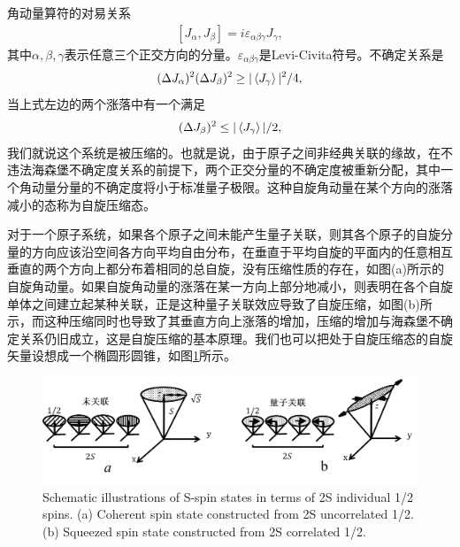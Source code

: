 角动量算符的对易关系
\begin{align}
	\left[ {{J_\alpha},{J_\beta}} \right] = i{\varepsilon _{\alpha\beta\gamma}}{J_\gamma},\label{eq3323}
\end{align}
其中$\alpha,\beta,\gamma$表示任意三个正交方向的分量。$\varepsilon _{\alpha\beta\gamma}$是Levi-Civita符号。不确定关系是
\begin{align}
(\Delta J_\alpha)^2(\Delta J_\beta)^2\ge |\braket{ J_\gamma}|^2/4,\label{eq3324}
\end{align}
当上式左边的两个涨落中有一个满足
\begin{align}\label{eq3325}
	\begin{split}
	(\Delta J_\beta)^2\le |\braket{ J_\gamma}|/2,
	\end{split}
\end{align}
我们就说这个系统是被压缩的。也就是说，由于原子之间非经典关联的缘故\cite{PRA1993Kitagawa}，在不违法海森堡不确定度关系的前提下，两个正交分量的不确定度被重新分配，其中一个角动量分量的不确定度将小于标准量子极限。这种自旋角动量在某个方向的涨落减小的态称为自旋压缩态。

对于一个原子系统，如果各个原子之间未能产生量子关联，则其各个原子的自旋分量的方向应该沿空间各方向平均自由分布，在垂直于平均自旋的平面内的任意相互垂直的两个方向上都分布着相同的总自旋，没有压缩性质的存在，如图(a)所示的自旋角动量。如果自旋角动量的涨落在某一方向上部分地减小，则表明在各个自旋单体之间建立起某种关联，正是这种量子关联效应导致了自旋压缩，如图(b)所示，而这种压缩同时也导致了其垂直方向上涨落的增加，压缩的增加与海森堡不确定关系仍旧成立，这是自旋压缩的基本原理。我们也可以把处于自旋压缩态的自旋矢量设想成一个椭圆形圆锥，如图\ref{figure4}所示。
\begin{figure}[htbp]
	\centering
	\includegraphics[scale=0.78]{Img/Fig_4.png}
	{Schematic illustrations of S-spin states in terms of 2S individual 1/2 spins. 
		(a) Coherent spin state constructed from 2S uncorrelated 1/2.
		(b) Squeezed spin state constructed from 2S correlated 1/2.
	}	
	\label{figure4}
\end{figure}


